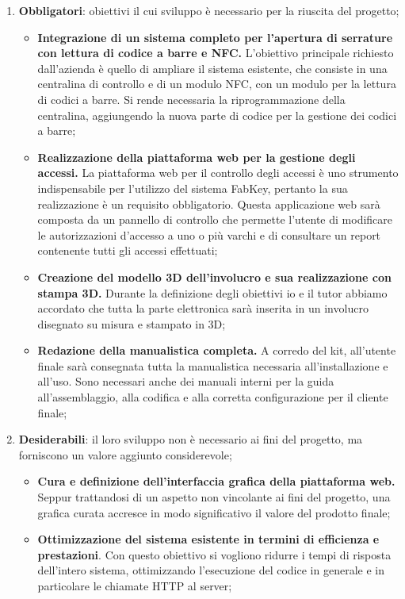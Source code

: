 \begin{enumerate}
\item \textbf{Obbligatori}: obiettivi il cui sviluppo è necessario per la riuscita del progetto;
\begin{itemize}
\item \textbf{Integrazione di un sistema completo per l'apertura di serrature con lettura di codice a barre e NFC.} L'obiettivo principale richiesto dall'azienda è quello di ampliare il sistema esistente, che consiste in una centralina di controllo e di un modulo NFC, con un modulo per la lettura di codici a barre. Si rende necessaria la riprogrammazione della centralina, aggiungendo la nuova parte di codice per la gestione dei codici a barre; 
\item \textbf{Realizzazione della piattaforma web per la gestione degli accessi.} La piattaforma web per il controllo degli accessi è uno strumento indispensabile per l'utilizzo del sistema FabKey, pertanto la sua realizzazione è un requisito obbligatorio. Questa applicazione web sarà composta da un pannello di controllo che permette l'utente di modificare le autorizzazioni d'accesso a uno o più varchi e di consultare un report contenente tutti gli accessi effettuati; 
\item \textbf{Creazione del modello 3D dell'involucro e sua realizzazione con stampa 3D.} Durante la definizione degli obiettivi io e il tutor abbiamo accordato che tutta la parte elettronica sarà inserita in un involucro disegnato su misura e stampato in 3D; 
\item \textbf{Redazione della manualistica completa.} A corredo del kit, all'utente finale sarà consegnata tutta la manualistica necessaria all'installazione e all'uso. Sono necessari anche dei manuali interni per la guida all'assemblaggio, alla codifica e alla corretta configurazione per il cliente finale;
\end{itemize}

\medskip

\item \textbf{Desiderabili}: il loro sviluppo non è necessario ai fini del progetto, ma forniscono un valore aggiunto considerevole;
\begin{itemize}
\item \textbf{Cura e definizione dell'interfaccia grafica della piattaforma web.} Seppur trattandosi di un aspetto non vincolante ai fini del progetto, una grafica curata accresce in modo significativo il valore del prodotto finale;
\item \textbf{Ottimizzazione del sistema esistente in termini di efficienza e prestazioni}. Con questo obiettivo si vogliono ridurre i tempi di risposta dell'intero sistema, ottimizzando l'esecuzione del codice in generale e in particolare le chiamate HTTP al server; 
\end{itemize}


\end{enumerate}
